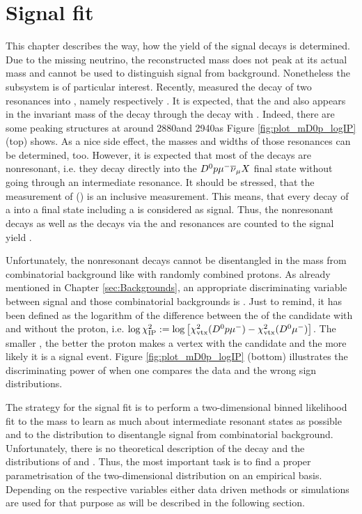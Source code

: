\chapter{Signal fit}
\label{sec:Signalfit}
This chapter describes the way, how the yield \NDp of the signal decays \LbToDpmunuX is determined.
Due to the missing neutrino, the reconstructed \Lb mass does not peak at its actual mass and cannot be used to distinguish signal from background.
Nonetheless the \Dz\proton subsystem is of particular interest.
Recently, \babar measured the decay of two \Lc resonances into \Dz\proton, namely \decay{\LcResI}{\Dz\proton} respectively \decay{\LcResII}{\Dz\proton} \cite{BaBar_D0p}.
It is expected, that the \LcResI and \LcResII also appears in the invariant \Dz\proton mass of the decay \LbToDpmunuX through the decay  with .
Indeed, there are some peaking structures at \MDp around 2880\mev and 2940\mev as Figure \ref{fig:plot_mD0p_logIP} (top) shows.
As a nice side effect, the masses and widths of those resonances can be determined, too.
However, it is expected that most of the \LbToDpmunuX decays are nonresonant, i.e. they decay directly into the ${{D}^0}{p}{\mu^-}{{\overline{\nu}}_\mu} X$ final state without going through an intermediate resonance.
It should be stressed, that the measurement of \BR(\LbToDpmunuX) is an inclusive measurement.
This means, that every decay of a \Lb into a final state including a \Dz\proton\mun\neumb is considered as signal.
Thus, the nonresonant \Lb decays as well as the decays via the \LcResI and \LcResII resonances are counted to the signal yield \NDp.

Unfortunately, the nonresonant \Lb decays cannot be disentangled in the \Dz\proton mass from combinatorial background like \BToDmunuX with randomly combined protons.
As already mentioned in Chapter \ref{sec:Backgrounds}, an appropriate discriminating variable between signal and those combinatorial backgrounds is \logIP.
Just to remind, it has been defined as the logarithm of the difference between the \chisqvtx of the \Dz\mun candidate with and without the proton, i.e. $\log \chi^2_{\text{IP}} := \log\left[\chi^2_{\rm vtx}({{D}^0}{p}{\mu^-}) - \chi^2_{\rm vtx}({{D}^0}{\mu^-})\right]$.
The smaller \logIP, the better the proton makes a vertex with the \Dz\mun candidate and the more likely it is a \LbToDpmunuX signal event.
Figure \ref{fig:plot_mD0p_logIP} (bottom) illustrates the discriminating power of \logIP when one compares the data and the wrong sign distributions.

The strategy for the signal fit is to perform a two-dimensional binned likelihood fit to the \Dz\proton mass to learn as much about intermediate resonant states as possible and to the \logIP distribution to disentangle \LbToDpmunuX signal from combinatorial background.
Unfortunately, there is no theoretical description of the \LbToDpmunuX decay and the distributions of \MDp and \logIP.
Thus, the most important task is to find a proper parametrisation of the two-dimensional distribution on an empirical basis.
Depending on the respective variables either data driven methods or simulations are used for that purpose as will be described in the following section.

